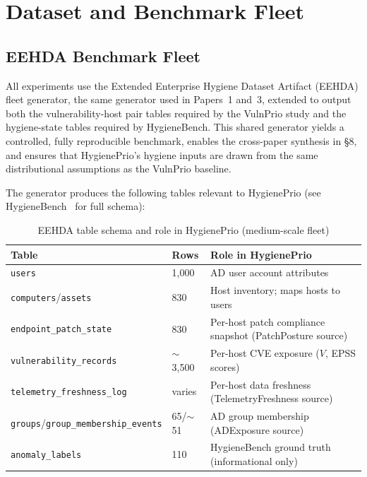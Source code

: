 \section{Dataset and Benchmark Fleet}

\subsection{EEHDA Benchmark Fleet}

All experiments use the Extended Enterprise Hygiene Dataset Artifact (EEHDA) fleet generator, the same generator used in Papers~1 and~3, extended to output both the vulnerability-host pair tables required by the VulnPrio study and the hygiene-state tables required by HygieneBench. This shared generator yields a controlled, fully reproducible benchmark, enables the cross-paper synthesis in \S8, and ensures that HygienePrio's hygiene inputs are drawn from the same distributional assumptions as the VulnPrio baseline.

The generator produces the following tables relevant to HygienePrio (see HygieneBench~\cite{paper3hygienebench} for full schema):

\begin{table}[!t]
 \caption{EEHDA table schema and role in HygienePrio (medium-scale fleet)}
 \label{tab:eehda_schema}
 \centering
 \begin{tabular}{>{\raggedright}p{4.5cm}
 >{\raggedright}p{2.4cm}
 >{\raggedright\arraybackslash}p{8.0cm}}
 \toprule
 \textbf{Table} & \textbf{Rows} & \textbf{Role in HygienePrio} \\
 \midrule
 \texttt{users} & 1,000 & AD user account attributes \\
 \texttt{computers}/\texttt{assets} & 830 & Host inventory; maps hosts to users \\
 \texttt{endpoint\_patch\_state} & 830 & Per-host patch compliance snapshot (PatchPosture source) \\
 \texttt{vulnerability\_records} & $\sim$3,500 & Per-host CVE exposure ($V$, EPSS scores) \\
 \texttt{telemetry\_freshness\_log} & varies & Per-host data freshness (TelemetryFreshness source) \\
 \texttt{groups}/\texttt{group\_membership\_events} & 65/$\sim$51 & AD group membership (ADExposure source) \\
 \texttt{anomaly\_labels} & 110 & HygieneBench ground truth (informational only) \\
 \bottomrule
 \end{tabular}
\end{table}

